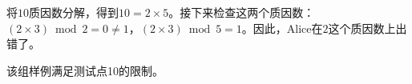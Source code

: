将$10$质因数分解，得到$10=2\times 5$。接下来检查这两个质因数：$(2\times 3)\bmod 2=0\not=1$，$(2\times 3)\bmod 5=1$。因此，Alice在$2$这个质因数上出错了。

该组样例满足测试点10的限制。